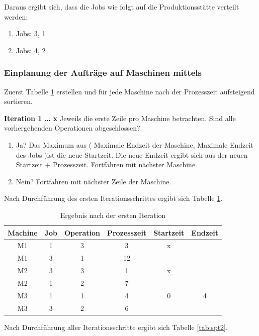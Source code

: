 \documentclass[final, english, ngerman, a4paper, 12pt, %
numbers=noenddot,
cd=true,
cdfont=false,cdfont=nohead,cdfont=nodin,
cdmath=false,
cdhead=false,
cdfoot=true,
cdcover=monochrome,
cdgeometry=symmetric,
declaration=heading,
declaration=notoc,
abstract=heading,
]{tudscrreprt}
\begin{document}
\noindent
Daraus ergibt sich, dass die Jobs wie folgt auf die Produktionsstätte verteilt werden:
\begin{enumerate}
	\item Jobs: {3, 1}
	\item Jobs: {4, 2}
\end{enumerate}

\subsubsection{Einplanung der Aufträge auf Maschinen mittels  }
Zuerst Tabelle \ref{tab:spt1} erstellen und für jede Maschine nach der Prozesszeit aufsteigend sortieren.

\noindent
\textbf{Iteration 1 … x}
Jeweils die erste Zeile pro Maschine betrachten. Sind alle vorhergehenden Operationen abgeschlossen?

\begin{enumerate}
	\item Ja? Das Maximum aus ( Maximale Endzeit der Maschine, Maximale Endzeit des Jobs )ist die neue Startzeit. Die neue Endzeit ergibt sich aus der neuen Startzeit + Prozesszeit. Fortfahren mit nächster Maschine.
	\item Nein? Fortfahren mit nächster Zeile der Maschine.
\end{enumerate}

\noindent
Nach Durchführung des ersten Iterationsschrittes ergibt sich Tabelle \ref{tab:spt1}.

\begin{table}[H]
	\centering
	\begin{tabular}{c c c c c c}
		\toprule
		Machine & Job & Operation & Prozesszeit & Startzeit & Endzeit\\
		\midrule
		M1 & 1 & 3 & 3 & x &\\
		M1 & 3 & 1 & 12 & &\\
		M2 & 3 & 3 & 1 & x &\\
		M2 & 1 & 2 & 7 & &\\
		M3 & 1 & 1 & 4 & 0 & 4\\
		M3 & 3 & 2 & 6 & &\\
		\bottomrule
	\end{tabular}
	\caption{Ergebnis nach der ersten Iteration}
	\label{tab:spt1}
\end{table}

\noindent
Nach Durchführung aller Iterationsschritte ergibt sich Tabelle \ref{tab:spt2}.
\end{document}

